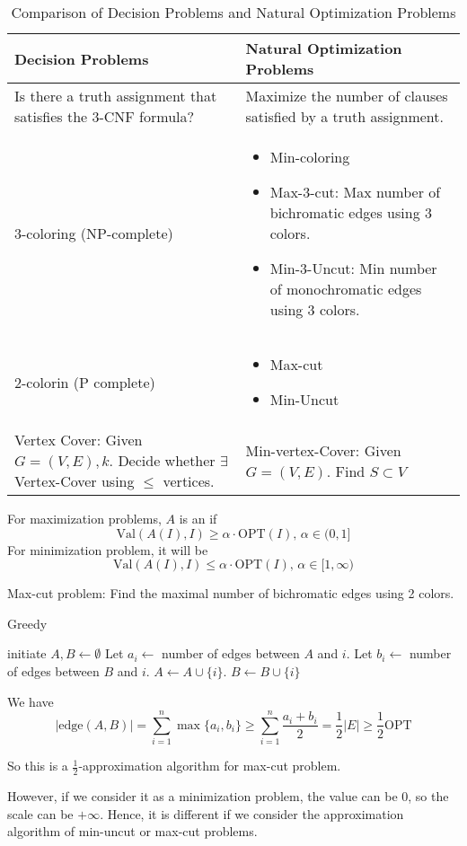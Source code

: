 \begin{table}[h!]
    \centering
    \begin{tabular}{|p{5cm}|p{7cm}|}
        \hline
        \textbf{Decision Problems} & \textbf{Natural Optimization Problems} \\ \hline
        Is there a truth assignment that satisfies the 3-CNF formula? & Maximize the number of clauses satisfied by a truth assignment. \\ \hline
        3-coloring (NP-complete)& \begin{itemize}
            \item Min-coloring
            \item Max-3-cut: Max number of bichromatic edges using 3 colors.
            \item Min-3-Uncut: Min number of monochromatic edges using 3 colors.
        \end{itemize} \\ \hline
        2-colorin (P complete)&\begin{itemize}
            \item Max-cut
            \item Min-Uncut
        \end{itemize}\\ \hline
        Vertex Cover: Given  $ G=(V,E),k $. Decide whether  $ \exists  $ Vertex-Cover using  $  \leq  $ vertices.   &Min-vertex-Cover: Given  $ G=(V,E) $. Find  $ S\subset V $ \st  $ \forall e=(u,v)\in E $,  $ |\{u,v\}\cap S| \geq 1 $,  $ |S| $ is minimized.\\ \hline

    \end{tabular}
    \caption{Comparison of Decision Problems and Natural Optimization Problems}
    \label{tab:decision_vs_optimization}
\end{table}

For maximization problems,  $ A  $ is an    if 
\[\mathrm{Val}(A(I),I) \geq \alpha \cdot\mathrm{OPT}(I),\,\alpha\in (0,1]\]
For minimization problem, it will be 
\[\mathrm{Val}(A(I),I) \leq \alpha \cdot\mathrm{OPT}(I),\,\alpha\in [1,\infty)\]

Max-cut problem: Find the maximal   number of bichromatic edges using 2 colors.
\begin{algorithm}
    \caption{Greedy}
    \begin{algorithmic}
        \STATE initiate  $ A,B\leftarrow\emptyset $ 
            \STATE Let  $ a_i\leftarrow $ number of edges between  $ A $ and  $ i $.
            \STATE Let  $ b_i\leftarrow $ number of edges between  $ B $ and  $ i $.
            \STATE  $ A\leftarrow A\cup\{i\} $.
            \ELSE \STATE $ B\leftarrow B\cup\{i\} $ 
            \ENDIF   
        \ENDFOR
    \end{algorithmic}
\end{algorithm} 
We have 
\[|\mathrm{edge}(A,B)|=\sum_{i=1}^n\max\{a_i,b_i\} \geq \sum_{i=1}^n\frac{a_i+b_i}{2}=\frac{1}{2}|E| \geq \frac{1}{2}\mathrm{OPT}\]

So this is a   $ \frac{1}{2} $-approximation algorithm for max-cut problem.

However, if we consider it as a minimization problem, the value can be  $ 0 $, so the scale can be  $ +\infty $. Hence, it is different if we consider the approximation algorithm of min-uncut or max-cut  problems.



